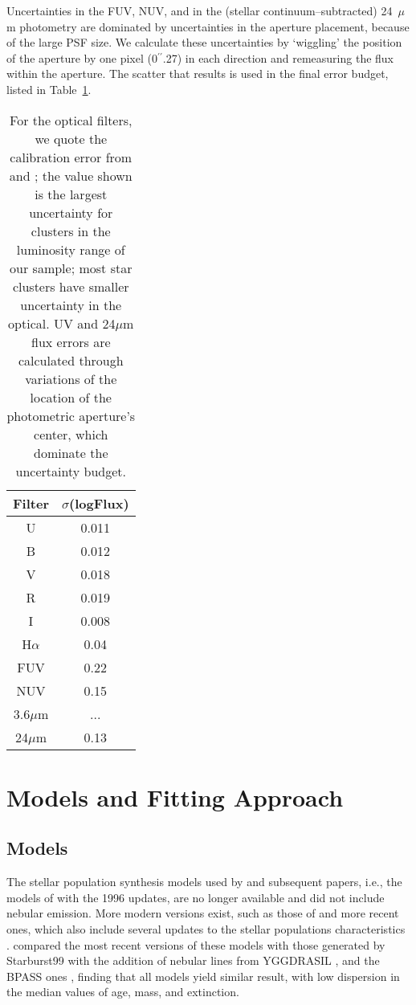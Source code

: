 \documentclass{aastex63}
\begin{document}
Uncertainties in the FUV, NUV, and in the (stellar continuum--subtracted) 24~$\mu$m photometry are dominated by uncertainties in the aperture placement, because of the large PSF size. We calculate these uncertainties by `wiggling' the position of the aperture by one pixel (0$^{\prime\prime}$.27) in  each direction and remeasuring the flux within the aperture. The scatter that results is used in the final error budget, listed in Table~\ref{logf_err_table}.

\begin{table}[!htb]
\begin{center}
\begin{tabular}{@{}cc@{}}
\toprule
Filter  & $\sigma$(logFlux) \\ \hline
U  & 0.011 \\
B  & 0.012 \\
V  & 0.018\\
R  & 0.019 \\
I  & 0.008 \\
H$\alpha$ & 0.04 \\
FUV & 0.22 \\
NUV & 0.15 \\
3.6$\mu$m & ... \\
24$\mu$m & 0.13 \\ \hline
\end{tabular}
\end{center}
    \caption{For the optical filters, we quote the calibration error from \citet{Massey+2006} and \citet{Massey+2007};  the value shown is the largest uncertainty for clusters in the luminosity range of our sample; most star clusters have smaller uncertainty in the optical. UV and 24$\mu$m flux errors are calculated through variations of the location of the photometric aperture's center, which dominate the uncertainty budget.}
    \label{logf_err_table}
\end{table}


\section{Models and Fitting Approach} \label{models}

\subsection{Models}
The stellar population synthesis models used by \citet{Ma+2001} and subsequent papers, i.e., the  models of \citet{BruzualCharlot1993} with the 1996 updates, are no longer available and did not include nebular emission. More modern versions exist, such as those of \citet{BruzualCharlot2003} and more recent ones, which also include several updates to the stellar populations characteristics \citep[e.g.][]{Gutkin2016}. \citet{Wofford+2016} compared the most recent versions of these models with those generated by Starburst99 \citep{Leitherer+1999, Vazquez+2005} with the addition of nebular lines from YGGDRASIL \citep{Zackrisson+2011}, and the BPASS ones \citep{Stanway+2020}, finding that all models yield similar result, with low dispersion in the median values of age, mass, and extinction. 
\end{document}
